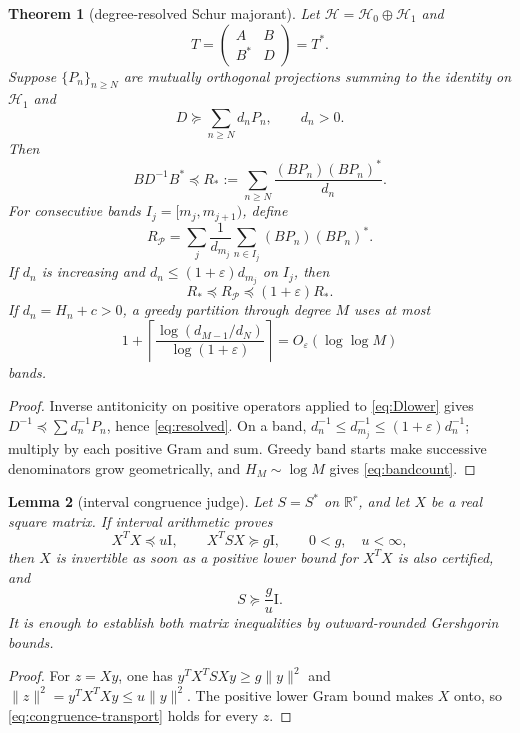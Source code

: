 \documentclass[10pt]{article}
\newtheorem{theorem}{Theorem}[section]
\newtheorem{lemma}[theorem]{Lemma}
\newcommand{\R}{\mathbb R}
\newcommand{\Id}{\mathrm I}
\begin{document}
\begin{theorem}[degree-resolved Schur majorant]\label{thm:schur}
Let $\mathcal H=\mathcal H_0\oplus\mathcal H_1$ and
\[
 T=\begin{pmatrix}A&B\\B^*&D\end{pmatrix}=T^*.
\]
Suppose $\{P_n\}_{n\ge N}$ are mutually orthogonal projections summing to the
identity on $\mathcal H_1$ and
\begin{equation}\label{eq:Dlower}
 D\succeq\sum_{n\ge N}d_nP_n,\qquad d_n>0.
\end{equation}
Then
\begin{equation}\label{eq:resolved}
 BD^{-1}B^*\preceq R_*:=
 \sum_{n\ge N}\frac{(BP_n)(BP_n)^*}{d_n}.
\end{equation}
For consecutive bands $I_j=[m_j,m_{j+1})$, define
\[
 R_{\mathcal P}=\sum_j\frac1{d_{m_j}}
 \sum_{n\in I_j}(BP_n)(BP_n)^*.
\]
If $d_n$ is increasing and $d_n\le(1+\varepsilon)d_{m_j}$ on $I_j$, then
\begin{equation}\label{eq:relative}
 R_*\preceq R_{\mathcal P}\preceq(1+\varepsilon)R_*.
\end{equation}
If $d_n=H_n+c>0$, a greedy partition through degree $M$ uses at most
\begin{equation}\label{eq:bandcount}
 1+\left\lceil\frac{\log(d_{M-1}/d_N)}
 {\log(1+\varepsilon)}\right\rceil
 =O_\varepsilon(\log\log M)
\end{equation}
bands.
\end{theorem}
\begin{proof}
Inverse antitonicity on positive operators applied to \eqref{eq:Dlower}
gives
$D^{-1}\preceq\sum d_n^{-1}P_n$, hence \eqref{eq:resolved}.
On a band,
$d_n^{-1}\le d_{m_j}^{-1}\le(1+\varepsilon)d_n^{-1}$; multiply by each
positive Gram and sum.  Greedy band starts make successive denominators grow
geometrically, and $H_M\sim\log M$ gives \eqref{eq:bandcount}.
\end{proof}

\begin{lemma}[interval congruence judge]\label{lem:congruence}
Let $S=S^*$ on $\R^r$, and let $X$ be a real square matrix.  If interval
arithmetic proves
\[
 X^TX\preceq u\Id,\qquad X^TSX\succeq g\Id,
 \qquad 0<g,\quad u<\infty,
\]
then $X$ is invertible as soon as a positive lower bound for $X^TX$ is also
certified, and
\begin{equation}\label{eq:congruence-transport}
 S\succeq \frac gu\Id.
\end{equation}
It is enough to establish both matrix inequalities by outward-rounded
Gershgorin bounds.
\end{lemma}
\begin{proof}
For $z=Xy$, one has
$y^TX^TSXy\ge g\|y\|^2$ and
$\|z\|^2=y^TX^TXy\le u\|y\|^2$.
The positive lower Gram bound makes $X$ onto, so \eqref{eq:congruence-transport}
holds for every $z$.
\end{proof}
\end{document}
